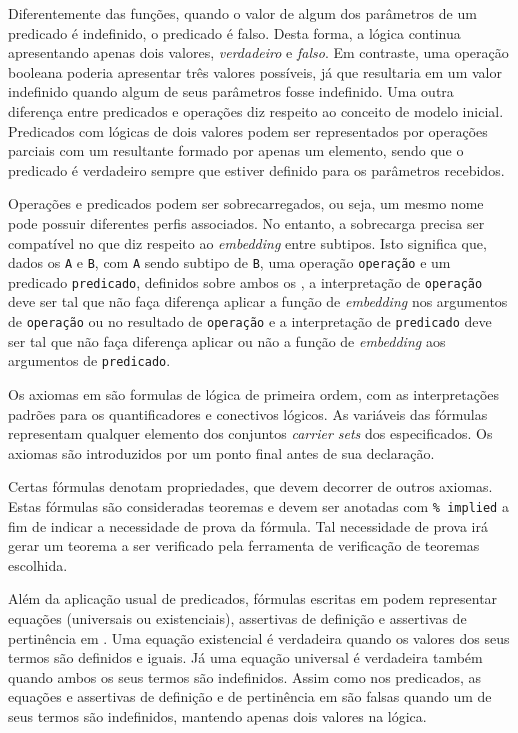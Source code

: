 Diferentemente das funções, quando o valor de algum dos parâmetros de um predicado é indefinido, o predicado é falso.
Desta forma, a lógica continua apresentando apenas dois valores, \textit{verdadeiro} e \textit{falso}.
Em contraste, uma operação booleana poderia apresentar três valores possíveis, já que resultaria em um valor indefinido quando algum de seus parâmetros fosse indefinido.
Uma outra diferença entre predicados e operações diz respeito ao conceito de modelo inicial.
Predicados com lógicas de dois valores podem ser representados por operações parciais com um \sort resultante formado por apenas um elemento, sendo que o predicado é verdadeiro sempre que estiver definido para os parâmetros recebidos.

Operações e predicados podem ser sobrecarregados, ou seja, um mesmo nome pode possuir diferentes perfis associados.
No entanto, a sobrecarga precisa ser compatível no que diz respeito ao \textit{embedding} entre subtipos.
Isto significa que, dados os \sorts \Verb.A. e \Verb.B., com \Verb.A. sendo subtipo de \Verb.B., uma operação \Verb.operação. e um predicado \Verb.predicado., definidos sobre ambos os \sorts, a interpretação de \Verb.operação. deve ser tal que não faça diferença aplicar a função de \textit{embedding} nos argumentos de \Verb.operação. ou no resultado de \Verb.operação. e a interpretação de \Verb.predicado. deve ser tal que não faça diferença aplicar ou não a função de \textit{embedding} aos argumentos de \Verb.predicado..

Os axiomas em \CASL são formulas de lógica de primeira ordem, com as interpretações padrões para os quantificadores e conectivos lógicos.
As variáveis das fórmulas representam qualquer elemento dos conjuntos \textit{carrier sets} dos \sorts especificados.
Os axiomas são introduzidos por um ponto final antes de sua declaração.

Certas fórmulas denotam propriedades, que devem decorrer de outros axiomas.
Estas fórmulas são consideradas teoremas e devem ser anotadas com \Verb.%
Tal necessidade de prova irá gerar um teorema a ser verificado pela ferramenta de verificação de teoremas escolhida.

Além da aplicação usual de predicados, fórmulas escritas em \CASL podem representar equações (universais ou existenciais), assertivas de definição e assertivas de pertinência em \sorts.
Uma equação existencial é verdadeira quando os valores dos seus termos são definidos e iguais.
Já uma equação universal é verdadeira também quando ambos os seus termos são indefinidos.
Assim como nos predicados, as equações e assertivas de definição e de pertinência em \sorts são falsas quando um de seus termos são indefinidos, mantendo apenas dois valores na lógica.

